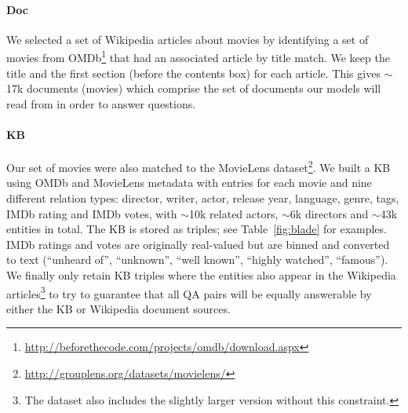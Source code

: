 \paragraph{Doc}
We selected a set of Wikipedia articles about movies
by identifying a set of movies from OMDb\footnote{\tiny{\url{http://beforethecode.com/projects/omdb/download.aspx}}}
that had an associated article by title match.
We keep the title and the first section (before the contents box) for each article.
This gives $\sim$17k documents (movies) which comprise the set of documents our
models will read from in order to answer questions.

\paragraph{KB}
Our set of movies were also matched to
the MovieLens dataset\footnote{\tiny{\url{http://grouplens.org/datasets/movielens/}}}.
We built a KB using OMDb and MovieLens metadata with entries for each movie and nine different relation types:
director, writer, actor, release year, language, genre, tags, IMDb rating and IMDb votes,
with $\sim$10k related actors, $\sim$6k directors and
$\sim$43k  entities in total.
The KB is stored as triples; see Table~\ref{fig:blade} for examples.
IMDb ratings and votes
are originally real-valued but are binned and converted to text
 (``unheard of'', ``unknown'', ``well known'', ``highly watched'', ``famous'').
We finally only retain KB triples where the entities also appear in the Wikipedia
articles\footnote{The dataset also
includes the slightly larger version without this constraint.}
to try to
guarantee that all QA pairs will be equally answerable by either the KB or Wikipedia document
sources.

